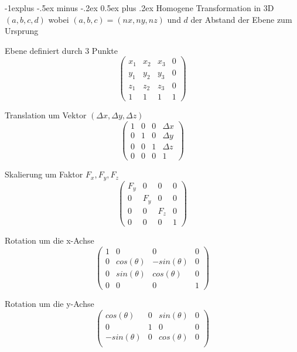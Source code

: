 \documentclass[landscape]{article}
\makeatletter
\renewcommand{\subsection}{\@startsection{subsection}{2}{0mm}%
                                {-1explus -.5ex minus -.2ex}%
                                {0.5ex plus .2ex}%
                                {\normalfont\normalsize\bfseries}}
\makeatother
\begin{document}
\begin{multicols}{3}
  \subsection{Homogene Transformation in 3D}
  $(a,b,c,d)$ wobei $(a,b,c)=(nx,ny,nz)$ und $d$ der Abstand der Ebene zum Ursprung
  \begin{itemize*}
    \item Ebene definiert durch 3 Punkte
    $$\begin{pmatrix}
        x_1 & x_2 & x_3 & 0 \\
        y_1 & y_2 & y_3 & 0 \\ 
        z_1 & z_2 & z_3 & 0 \\
        1   & 1   & 1   & 1
      \end{pmatrix}$$
    \item Translation um Vektor $(\Delta x, \Delta y,\Delta z)$
    $$\begin{pmatrix}
        1 & 0 & 0 & \Delta x \\
        0 & 1 & 0 & \Delta y \\ 
        0 & 0 & 1 & \Delta z \\
        0 & 0 & 0 & 1
      \end{pmatrix}$$
    \item Skalierung um Faktor $F_x,F_y,F_z$
    $$\begin{pmatrix}
        F_y & 0   & 0   & 0 \\
        0   & F_y & 0   & 0 \\ 
        0   & 0   & F_z & 0 \\
        0   & 0   & 0   & 1
      \end{pmatrix}$$
    \item Rotation um die x-Achse
    $$\begin{pmatrix}
        1 & 0           & 0            & 0 \\
        0 & cos(\theta) & -sin(\theta) & 0 \\ 
        0 & sin(\theta) & cos(\theta)  & 0 \\
        0 & 0           & 0            & 1
      \end{pmatrix}$$
    \item Rotation um die y-Achse
    $$\begin{pmatrix}
        cos(\theta)  & 0 & sin(\theta) & 0 \\
        0            & 1 & 0           & 0 \\ 
        -sin(\theta) & 0 & cos(\theta) & 0 \\

\end{pmatrix}$$
\end{itemize*}
\end{multicols}
\end{document}

